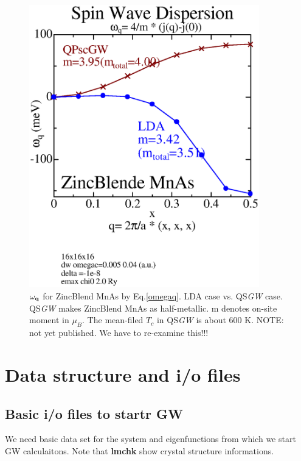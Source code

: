 \documentclass[a4paper,10pt,epsf,fleqn]{article}
\newcommand{\bfq}{{\bf q}}
\newcommand{\exe}[1]{{\bf #1}}
\newcommand{\scgw}{QS{\it GW} }
\begin{document}
\begin{figure}[hbpt]
\begin{center}
\includegraphics[width=10cm]{ZBmnasw1.eps}
\end{center}
\caption[]{
$\omega_\bfq$ for ZincBlend MnAs by Eq.\ref{omegaq}. 
LDA case vs. \scgw case. 
\scgw makes ZincBlend MnAs as half-metallic. 
m denotes on-site moment in $\mu_B$. 
The mean-filed $T_c$ in \scgw is about 600 K.
{\large NOTE: not yet published. We have to re-examine this!!!}}
\label{zbmnas}
\end{figure}



\newpage
\section{Data structure and i/o files}

\baselineskip=4mm

\subsection{Basic i/o files to startr GW}
We need basic data set for the system and eigenfunctions
from which we start GW calculaitons. Note that \exe{lmchk} show crystal
structure informations.
\end{document}
